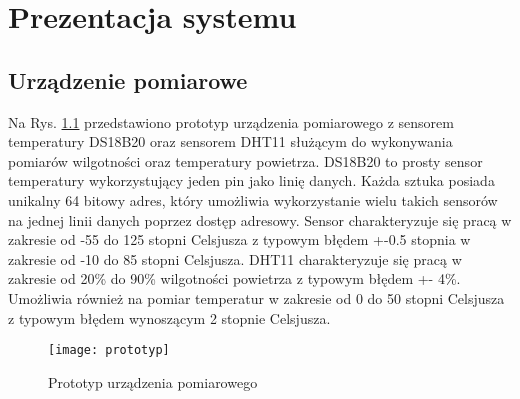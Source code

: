 \chapter{Prezentacja systemu}

\section{Urządzenie pomiarowe}
Na Rys. \ref{prototyp} przedstawiono prototyp urządzenia pomiarowego z sensorem
temperatury DS18B20 oraz sensorem DHT11 służącym do wykonywania pomiarów wilgotności oraz temperatury powietrza. 
DS18B20 to prosty sensor temperatury wykorzystujący jeden
pin jako linię danych. Każda sztuka posiada unikalny 64 bitowy adres, który
umożliwia wykorzystanie wielu takich sensorów na jednej linii danych poprzez
dostęp adresowy. Sensor charakteryzuje się pracą w zakresie od -55 do 125 stopni 
Celsjusza z typowym błędem +-0.5 stopnia w zakresie od -10 do 85 stopni Celsjusza.
DHT11 charakteryzuje się pracą w zakresie od 20\% do 90\% wilgotności powietrza z
typowym błędem +- 4\%. Umożliwia również na pomiar temperatur w zakresie od 0 do 50
stopni Celsjusza z typowym błędem wynoszącym 2 stopnie Celsjusza.
\begin{figure}[h!]
  \centering
  \texttt{[image: prototyp]}
  \caption{Prototyp urządzenia pomiarowego}
  \label{prototyp}
\end{figure}

